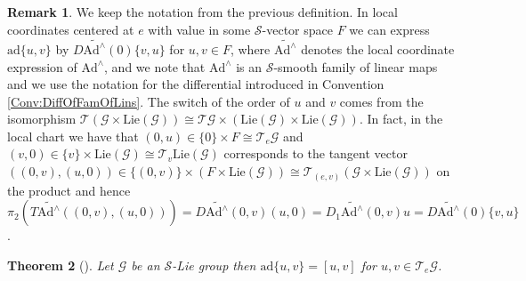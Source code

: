 \documentclass[12pt,a4paper]{article}
\theoremstyle{plain}
\newtheorem{theorem}{Theorem}[subsection]
\theoremstyle{definition}
\newtheorem{remark}[theorem]{Remark}
\newcommand{\Scal}{\mathcal{S}}
\newcommand{\Gcal}{\mathcal{G}}
\begin{document}
\begin{remark}
\label{Rem:LocalFormulaForad}
We keep the notation from the previous definition.
In local coordinates centered at $e$ with value in some $\Scal$-vector space $F$ we can express $\mathrm{ad}\{u,v\}$ by $D\widetilde{\mathrm{Ad}^\wedge}(0)\{v,u\}$ for $u,v\in F$, where $\widetilde{\mathrm{Ad}^\wedge}$ denotes the local coordinate expression of $\mathrm{Ad}^\wedge$, and we note that $\mathrm{Ad}^\wedge$ is an $\Scal$-smooth family of linear maps and we use the notation for the differential introduced in Convention \ref{Conv:DiffOfFamOfLins}.
The switch of the order of $u$ and $v$ comes from the isomorphism $\mathcal T(\Gcal\times \mathrm{Lie}(\Gcal))\cong \mathcal T \Gcal \times (\mathrm{Lie}(\Gcal)\times \mathrm{Lie}(\Gcal))$. In fact, in the local chart we have that $(0,u)\in \{0\}\times F\cong \mathcal{T}_e\Gcal$ and $(v,0)\in \{v\}\times \mathrm{Lie}(\Gcal)\cong \mathcal{T}_v\mathrm{Lie}(\Gcal)$ corresponds to the tangent vector $((0,v),(u,0))\in \{(0,v)\}\times (F\times \mathrm{Lie}(\Gcal))\cong \mathcal T_{(e,v)}(\Gcal\times \mathrm{Lie}(\Gcal))$ on the product and hence $\pi_2(T\widetilde{\mathrm{Ad}^\wedge}((0,v),(u,0)))=D\widetilde{\mathrm{Ad}^\wedge}(0,v)(u,0)=D_1\widetilde{\mathrm{Ad}^\wedge}(0,v)u=D\widetilde{\mathrm{Ad}^\wedge}(0)\{v,u\}$.     
\end{remark}


\begin{theorem}[{\cite[Proposition III.1.16]{InfDimLieneeb}}]
\label{Thm:ad=[-,-]}
Let $\Gcal$ be an $\Scal$-Lie group then $\mathrm{ad}\{u,v\}=[u,v]$ for $u,v\in \mathcal{T}_e\Gcal$.
\end{theorem}
\end{document}
